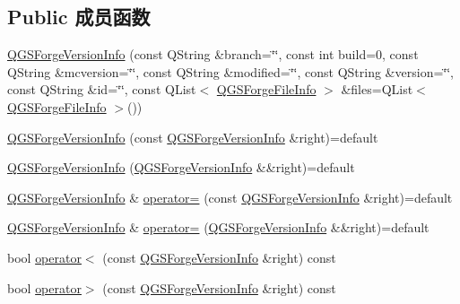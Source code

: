 \subsection*{Public 成员函数}
\begin{DoxyCompactItemize}
\item 
\mbox{\hyperlink{class_q_g_s_forge_version_info_af53165123913497faf3768e70155d33b}{Q\+G\+S\+Forge\+Version\+Info}} (const Q\+String \&branch=\char`\"{}\char`\"{}, const int build=0, const Q\+String \&mcversion=\char`\"{}\char`\"{}, const Q\+String \&modified=\char`\"{}\char`\"{}, const Q\+String \&version=\char`\"{}\char`\"{}, const Q\+String \&id=\char`\"{}\char`\"{}, const Q\+List$<$ \mbox{\hyperlink{class_q_g_s_forge_version_info_1_1_q_g_s_forge_file_info}{Q\+G\+S\+Forge\+File\+Info}} $>$ \&files=Q\+List$<$ \mbox{\hyperlink{class_q_g_s_forge_version_info_1_1_q_g_s_forge_file_info}{Q\+G\+S\+Forge\+File\+Info}} $>$())
\item 
\mbox{\hyperlink{class_q_g_s_forge_version_info_a45f3890443ea04f69ad68b055765e51f}{Q\+G\+S\+Forge\+Version\+Info}} (const \mbox{\hyperlink{class_q_g_s_forge_version_info}{Q\+G\+S\+Forge\+Version\+Info}} \&right)=default
\item 
\mbox{\hyperlink{class_q_g_s_forge_version_info_a5b9bc4900d2df72fbb4c0f1428a69269}{Q\+G\+S\+Forge\+Version\+Info}} (\mbox{\hyperlink{class_q_g_s_forge_version_info}{Q\+G\+S\+Forge\+Version\+Info}} \&\&right)=default
\item 
\mbox{\hyperlink{class_q_g_s_forge_version_info}{Q\+G\+S\+Forge\+Version\+Info}} \& \mbox{\hyperlink{class_q_g_s_forge_version_info_a8c04baec004e5b448e0943c2ffb59143}{operator=}} (const \mbox{\hyperlink{class_q_g_s_forge_version_info}{Q\+G\+S\+Forge\+Version\+Info}} \&right)=default
\item 
\mbox{\hyperlink{class_q_g_s_forge_version_info}{Q\+G\+S\+Forge\+Version\+Info}} \& \mbox{\hyperlink{class_q_g_s_forge_version_info_a224ff90028ab648150737f4d0b677e04}{operator=}} (\mbox{\hyperlink{class_q_g_s_forge_version_info}{Q\+G\+S\+Forge\+Version\+Info}} \&\&right)=default
\item 
bool \mbox{\hyperlink{class_q_g_s_forge_version_info_a97b1d9ce34aa19c46464ced601e7feaf}{operator$<$}} (const \mbox{\hyperlink{class_q_g_s_forge_version_info}{Q\+G\+S\+Forge\+Version\+Info}} \&right) const
\item 
bool \mbox{\hyperlink{class_q_g_s_forge_version_info_af5d8b833c123e5e830bf8e57331b00cf}{operator$>$}} (const \mbox{\hyperlink{class_q_g_s_forge_version_info}{Q\+G\+S\+Forge\+Version\+Info}} \&right) const

\end{DoxyCompactItemize}
